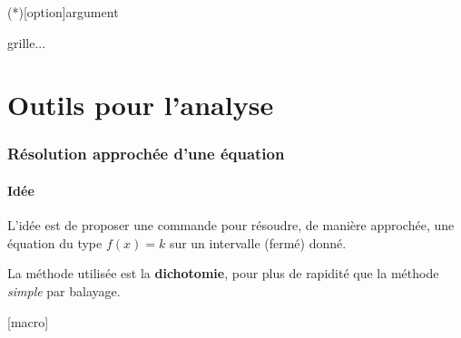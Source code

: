 \documentclass[a4paper,french,11pt]{article}
\newcommand\cmaj[1]{%
	{\tcbox[vignetteMaJ]{#1}\xspace}%
}
\begin{document}
\begin{codetex}
\ConversionFraction(*)[option]{argument}



\end{codetex}

\begin{codetex}
\begin{EnvSudoMaths}[options]{grille}...\end{EnvSudoMaths}
\end{codetex}

\newpage

\part{Outils pour l'analyse}

\section{Résolution approchée d'une équation}\label{resolapprox}

\subsection{Idée}

\begin{codeidee}
\cmaj{2.1.4} L'idée est de proposer une commande pour résoudre, de manière approchée, une équation du type $f(x)=k$ sur un intervalle (fermé) donné.

\smallskip

La méthode utilisée est la \textbf{dichotomie}, pour plus de rapidité que la méthode \textit{simple} par balayage.
\end{codeidee}

\begin{codetex}
[macro]
\end{codetex}
\end{document}
